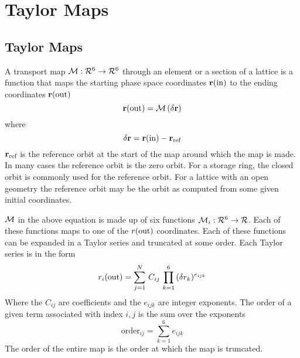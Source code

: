 \chapter{Taylor Maps}

\section{Taylor Maps}
\label{s:taylor.phys}

A transport map ${\cal M}: {\cal R}^6 \rightarrow {\cal R}^6$ through
an element or a section of a lattice is a function that maps the
starting phase space coordinates ${\bf r}({\text{in}})$ to the ending
coordinates ${\bf r}({\text{out}})$
\begin{equation}
  {\bf r}({\text{out}}) = {\cal M} \, (\delta {\bf r})
\end{equation}
where
\begin{equation}
  \delta {\bf r} = {\bf r}({\text{in}}) - {\bf r}_{\text{ref}}
\end{equation}
${\bf r}_{\text{ref}}$ is the reference orbit at the start of the map around which the map is
made. In many cases the reference orbit is the zero orbit. For a storage ring, the closed
orbit is commonly used for the reference orbit. For a lattice with an open geometry the
reference orbit may be the orbit as computed from some given initial coordinates.

${\cal M}$ in the above equation is made up of six functions ${\cal M}_i: {\cal R}^6
\rightarrow {\cal R}$. Each of these functions maps to one of the $r({\text{out}})$
coordinates. Each of these functions can be expanded in a Taylor series and truncated at
some order. Each Taylor series is in the form
\begin{equation}
  r_i({\text{out}}) = \sum_{j = 1}^N \, C_{ij} \, \prod_{k = 1}^6 \, (\delta r_k)^{e_{ijk}}
  \label{rcr}
\end{equation}
Where the $C_{ij}$ are coefficients and the $e_{ijk}$ are integer exponents.
The order of a given term associated with index $i,j$ is the sum over the exponents
\begin{equation}
  \text{order}_{ij} = \sum_{k = 1}^6 e_{ijk} 
\end{equation}
The order of the entire map is the order at which the map is truncated.

